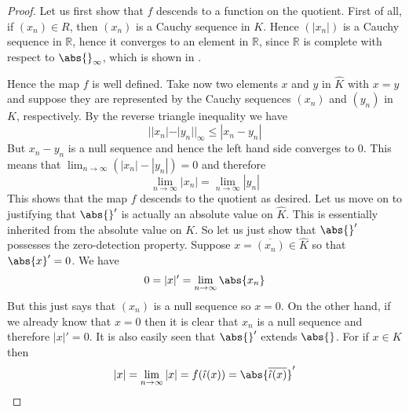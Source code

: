\documentclass{article}
\newcommand{\mbb}[1]{\mathbb{#1}}
\begin{document}
\begin{proof}
    Let us first show that $f$ descends to a function on the quotient. First of all, if $(x_n) \in R$, then $(x_n)$ is a Cauchy sequence in $K$. Hence  $(|x_n|)$ is a Cauchy sequence in $\mbb R$, hence it converges to an element in $\mbb R$, since $\mbb R$ is complete with respect to $\abs{}_\infty$, which is shown in \cite{}. 
    
    Hence the map $f$ is well defined. Take now two elements $x$ and $y$ in $\hat K$ with $x = y$ and suppose they are represented by the Cauchy sequences $(x_n)$ and $(y_n)$ in $K$, respectively. By the reverse triangle inequality we have 
    $$||x_n| - |y_n| |_\infty \leq |x_n - y_n|$$  
    But $x_n - y_n$ is a null sequence and hence the left hand side converges to 0. This means that $\lim_{n \to \infty} (|x_n| - |y_n|) = 0$ and therefore $$\lim_{n \to \infty} |x_n| = \lim_{n \to \infty}|y_n|$$ 
    This shows that the map $f$ descends to the quotient as desired. 
    Let us move on to justifying that $\abs{}'$ is actually an absolute value on $\hat K$. This is essentially inherited from the absolute value on $K$. So let us just show that $\abs{}'$ possesses the zero-detection property. Suppose $x = \overline {(x_n)} \in \hat K$ so that $\abs{x}' = 0$. We have
    $$0 = |x|' = \lim_{n \to \infty} \abs{x_n}$$
    But this just says that $(x_n)$ is a null sequence so $x = 0$. On the other hand, if we already know that $x = 0$ then it is clear that $x_n$ is a null sequence and therefore $|x|' = 0$. It is also easily seen that $\abs{}'$ extends $\abs{}$. For if $x \in K$ then 
    $$|x| = \lim_{n \to \infty} |x| = f(\hat \iota (x)) = \abs{\overline{ \hat \iota (x)}}'$$


\end{proof}
\end{document}
